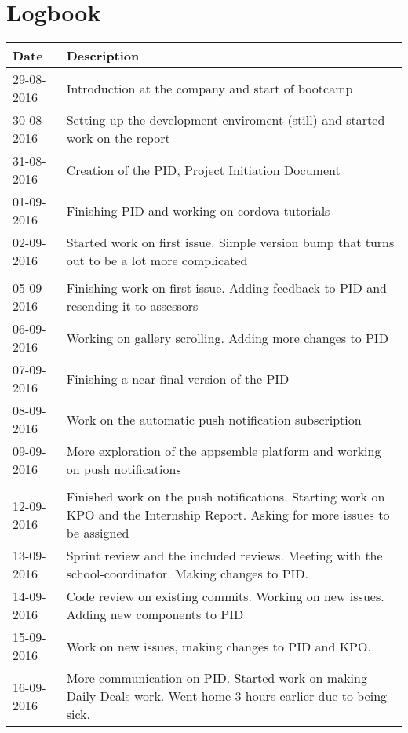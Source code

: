 \chapter{Logbook}
\begin{tabular}{|p{2cm}|p{11cm}|}
	\hline
	\textbf{Date} & \textbf{Description} \\
	\hline
	29-08-2016 & Introduction at the company and start of bootcamp \\ \hline
	30-08-2016 & Setting up the development enviroment (still) and started work on the report \\ \hline
	31-08-2016 &  Creation of the PID, Project Initiation Document \\ \hline
	01-09-2016 &  Finishing PID and working on cordova tutorials \\ \hline
	02-09-2016 &  Started work on first issue. Simple version bump that turns out to be a lot more complicated \\ \hline

	\\ \hline
	
	05-09-2016 &  Finishing work on first issue. Adding feedback to PID and resending it to assessors \\ \hline
	06-09-2016 &  Working on gallery scrolling. Adding more changes to PID \\ \hline
	07-09-2016 &  Finishing a near-final version of the PID \\ \hline
	08-09-2016 &  Work on the automatic push notification subscription \\ \hline
	09-09-2016 &  More exploration of the appsemble platform and working on push notifications \\ \hline
	
	\\ \hline
	
	12-09-2016 &  Finished work on the push notifications. Starting work on KPO and the Internship Report. Asking for more issues to be assigned \\ \hline
	13-09-2016 &  Sprint review and the included reviews. Meeting with the school-coordinator. Making changes to PID. \\ \hline
	14-09-2016 &  Code review on existing commits. Working on new issues. Adding new components to PID \\ \hline
	15-09-2016 &  Work on new issues, making changes to PID and KPO. \\ \hline
	16-09-2016 &  More communication on PID. Started work on making Daily Deals work. Went home 3 hours earlier due to being sick. \\ \hline
	

\end{tabular}

